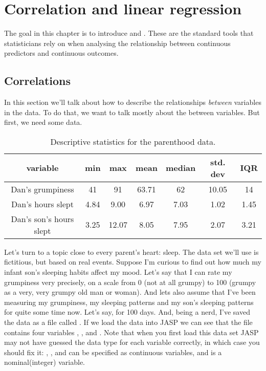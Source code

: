 
\chapter{Correlation and linear regression\label{ch:regression}}


The goal in this chapter is to introduce  and . These are the standard tools that statisticians rely on when analysing the relationship between continuous predictors and continuous outcomes. 


\section{Correlations\label{sec:correl}}

In this section we'll talk about how to describe the relationships {\it between} variables in the data. To do that, we want to talk mostly about the  between variables. But first, we need some data.


\begin{table}[ht]
\caption{Descriptive statistics for the parenthood data.} \tabcapsep
\label{tab:parenthood}
\begin{center}
\begin{tabular}{c|cccccc}  
variable & min & max & mean & median & std. dev & IQR \\ \hline
Dan's grumpiness & 41 & 91 & 63.71 & 62 & 10.05 & 14 \\
Dan's hours slept & 4.84 & 9.00 & 6.97 & 7.03 & 1.02 & 1.45  \\
Dan's son's hours slept & 3.25 & 12.07 & 8.05 & 7.95 & 2.07 & 3.21 \\ 
\end{tabular}
\tabcapsep
\HR
\end{center}
\end{table}


Let's turn to a topic close to every parent's heart: sleep. The data set we'll use is fictitious, but based on real events. Suppose I'm curious to find out how much my infant son's sleeping habits affect my mood. Let's say that I can rate my grumpiness very precisely, on a scale from 0 (not at all grumpy) to 100 (grumpy as a very, very grumpy old man or woman). And lets also assume that I've been measuring my grumpiness, my sleeping patterns and my son's sleeping patterns for quite some time now. Let's say, for 100 days. And, being a nerd, I've saved the data as a file called . If we load the data into JASP we can see that the file contains four variables , ,  and . Note that when you first load this data set JASP may not have guessed the data type for each variable correctly, in which case you should fix it:  , ,  and  can be specified as continuous variables, and  is a nominal(integer) variable.

